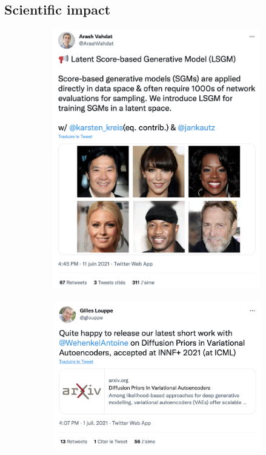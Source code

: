 \subsection{Scientific impact}
\begin{figure}
  \centering
  \begin{subfigure}[b]{.48\textwidth}
    \centering
    \includegraphics[width=.95\textwidth]{figures/impact_scholar/cont_diff_tweet.png}
    \caption{}
    \label{fig:cont_tweet}
  \end{subfigure}
  \begin{subfigure}[b]{.48\textwidth}
    \centering
    \includegraphics[width=.95\textwidth]{figures/impact_scholar/discret_diff_tweet.png}

\end{subfigure}
\end{figure}
